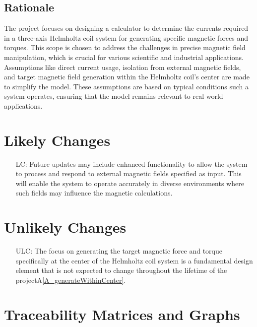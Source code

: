 \documentclass[12pt]{article}
\newcommand{\aref}[1]{A\ref{#1}}
\newcounter{lcnum} %
\newcounter{ulcnum} %
\begin{document}
\subsection{Rationale}
{
The project focuses on designing a calculator to determine the currents required in a three-axis Helmholtz coil system for generating specific magnetic forces and torques. This scope is chosen to address the challenges in precise magnetic field manipulation, which is crucial for various scientific and industrial applications. Assumptions like direct current usage, isolation from external magnetic fields, and target magnetic field generation within the Helmholtz coil's center are made to simplify the model. These assumptions are based on typical conditions such a system operates, ensuring that the model remains relevant to real-world applications.
}
\section{Likely Changes}    

\noindent \begin{itemize}

\item[LC\refstepcounter{lcnum}\thelcnum\label{LC_meaningfulLabel}:] {Future updates may include enhanced functionality to allow the system to process and respond to external magnetic fields specified as input. This will enable the system to operate accurately in diverse environments where such fields may influence the magnetic calculations.}

\end{itemize}

\section{Unlikely Changes}    

\noindent \begin{itemize}

\item[ULC\refstepcounter{ulcnum}\theulcnum\label{ULC_meaningfulLabel}:] {The focus on generating the target magnetic force and torque specifically at the center of the Helmholtz coil system is a fundamental design element that is not expected to change throughout the lifetime of the project\aref{A_generateWithinCenter}.}

\end{itemize}

\section{Traceability Matrices and Graphs}
\end{document}
